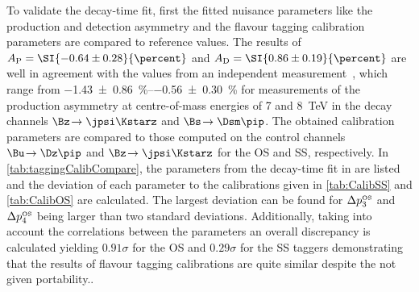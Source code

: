 To validate the decay-time fit, first the fitted nuisance parameters like the production and detection asymmetry and the flavour tagging calibration parameters are compared to reference values.
The results of $A_{\text{P}}=\SI{-0.64\pm0.28}{\percent}$ and $A_{\text{D}}=\SI{0.86\pm0.19}{\percent}$ are well in agreement with the values from an independent \lhcb measurement~\cite{Aaij:2017mso}, which \eg range from \SIrange{-1.43\pm0.86}{-0.56\pm0.30}{\percent} for measurements of the production asymmetry at centre-of-mass energies of \num{7} and \SI{8}{\tera\electronvolt} in the decay channels $\Bz\!\to\jpsi\Kstarz$ and $\Bs\!\to\Dsm\pip$.
The obtained calibration parameters are compared to those computed on the control channels $\Bu\!\to\Dz\pip$ and $\Bz\!\to\jpsi\Kstarz$ for the OS and SS, respectively.
In \cref{tab:taggingCalibCompare}, the parameters from the decay-time fit in \BdToDpi are listed and the deviation of each parameter to the calibrations given in \cref{tab:CalibSS} and \cref{tab:CalibOS} are calculated.
The largest deviation can be found for $\Delta p_{3}^{\text{\tiny OS}}$ and $\Delta p_{4}^{\text{\tiny OS}}$ being larger than two standard deviations.
Additionally, taking into account the correlations between the parameters an overall discrepancy is calculated yielding $0.91\sigma$ for the OS and $0.29\sigma$ for the SS taggers demonstrating that the results of flavour tagging calibrations are quite similar despite the not given portability..
